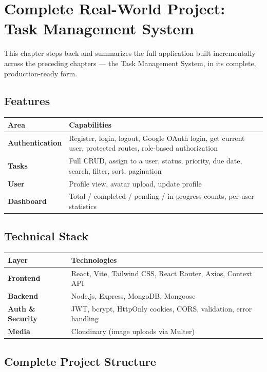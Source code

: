 \chapter{Complete Real-World Project: Task Management System}

This chapter steps back and summarizes the full application built
incrementally across the preceding chapters --- the Task Management
System, in its complete, production-ready form.

\section{Features}

\begin{tabularx}{\textwidth}{@{}>{\bfseries}p{3.2cm}X@{}}
\toprule
Area & Capabilities \\
\midrule
Authentication & Register, login, logout, Google OAuth login, get
current user, protected routes, role-based authorization \\
Tasks & Full CRUD, assign to a user, status, priority, due date, search,
filter, sort, pagination \\
User & Profile view, avatar upload, update profile \\
Dashboard & Total / completed / pending / in-progress counts, per-user
statistics \\
\bottomrule
\end{tabularx}

\section{Technical Stack}

\begin{tabularx}{\textwidth}{@{}>{\bfseries}p{3.2cm}X@{}}
\toprule
Layer & Technologies \\
\midrule
Frontend & React, Vite, Tailwind CSS, React Router, Axios, Context API \\
Backend & Node.js, Express, MongoDB, Mongoose \\
Auth \& Security & JWT, bcrypt, HttpOnly cookies, CORS, validation, error
handling \\
Media & Cloudinary (image uploads via Multer) \\
\bottomrule
\end{tabularx}

\section{Complete Project Structure}

